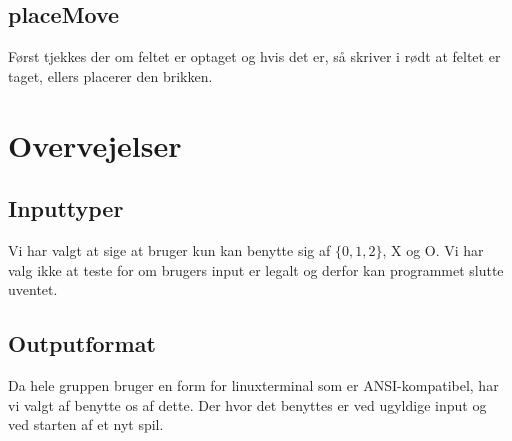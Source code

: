 \documentclass[a4paper,12pt]{article}
\begin{document}
\subsection*{placeMove}
Først tjekkes der om feltet er optaget og hvis det er, så skriver i rødt at feltet er taget, ellers placerer den brikken.


\section*{Overvejelser}
\subsection*{Inputtyper}
Vi har valgt at sige at bruger kun kan benytte sig af $\{0,1,2\}$, X og O. Vi har valg ikke at teste for om brugers input er legalt og derfor kan programmet slutte uventet.

\subsection*{Outputformat}
Da hele gruppen bruger en form for linuxterminal som er ANSI-kompatibel, har vi
valgt af benytte os af dette. Der hvor det benyttes er ved ugyldige input og ved
starten af et nyt spil.
\end{document}
